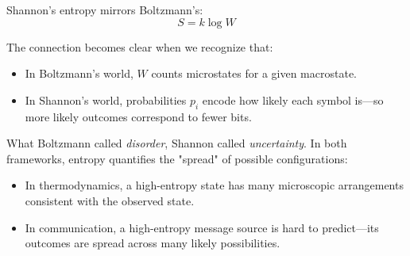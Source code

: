 Shannon’s entropy mirrors Boltzmann’s:
\[
S = k \log W
\]



The connection becomes clear when we recognize that:
\begin{itemize}
  \item In Boltzmann’s world, \( W \) counts microstates for a given macrostate.
  \item In Shannon’s world, probabilities \( p_i \) encode how likely each symbol is—so more likely outcomes correspond to fewer bits.
\end{itemize}

What Boltzmann called \emph{disorder}, Shannon called \emph{uncertainty}. In both frameworks, entropy quantifies the "spread" of possible configurations:
\begin{itemize}
  \item In thermodynamics, a high-entropy state has many microscopic arrangements consistent with the observed state.
  \item In communication, a high-entropy message source is hard to predict—its outcomes are spread across many likely possibilities.
\end{itemize}


